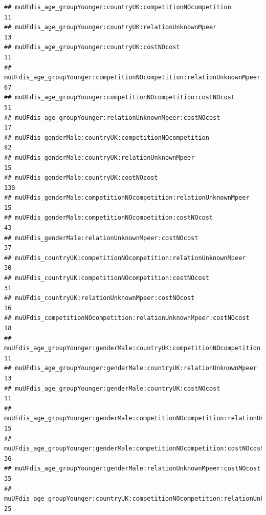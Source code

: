 \documentclass[
]{article}
\begin{document}
\begin{verbatim}
## muUFdis_age_groupYounger:countryUK:competitionNOcompetition                                                  11
## muUFdis_age_groupYounger:countryUK:relationUnknownMpeer                                                      13
## muUFdis_age_groupYounger:countryUK:costNOcost                                                                11
## muUFdis_age_groupYounger:competitionNOcompetition:relationUnknownMpeer                                       67
## muUFdis_age_groupYounger:competitionNOcompetition:costNOcost                                                 51
## muUFdis_age_groupYounger:relationUnknownMpeer:costNOcost                                                     17
## muUFdis_genderMale:countryUK:competitionNOcompetition                                                        82
## muUFdis_genderMale:countryUK:relationUnknownMpeer                                                            15
## muUFdis_genderMale:countryUK:costNOcost                                                                     130
## muUFdis_genderMale:competitionNOcompetition:relationUnknownMpeer                                             15
## muUFdis_genderMale:competitionNOcompetition:costNOcost                                                       43
## muUFdis_genderMale:relationUnknownMpeer:costNOcost                                                           37
## muUFdis_countryUK:competitionNOcompetition:relationUnknownMpeer                                              30
## muUFdis_countryUK:competitionNOcompetition:costNOcost                                                        31
## muUFdis_countryUK:relationUnknownMpeer:costNOcost                                                            16
## muUFdis_competitionNOcompetition:relationUnknownMpeer:costNOcost                                             18
## muUFdis_age_groupYounger:genderMale:countryUK:competitionNOcompetition                                       11
## muUFdis_age_groupYounger:genderMale:countryUK:relationUnknownMpeer                                           13
## muUFdis_age_groupYounger:genderMale:countryUK:costNOcost                                                     11
## muUFdis_age_groupYounger:genderMale:competitionNOcompetition:relationUnknownMpeer                            15
## muUFdis_age_groupYounger:genderMale:competitionNOcompetition:costNOcost                                      36
## muUFdis_age_groupYounger:genderMale:relationUnknownMpeer:costNOcost                                          35
## muUFdis_age_groupYounger:countryUK:competitionNOcompetition:relationUnknownMpeer                             25

\end{verbatim}
\end{document}
